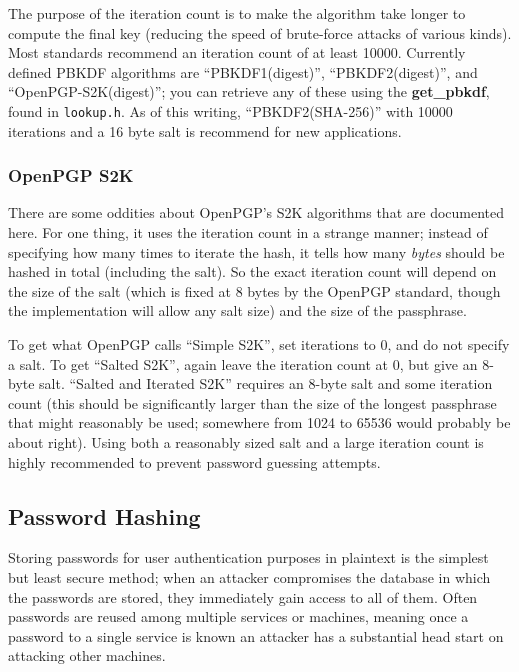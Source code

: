 \documentclass{article}
\newcommand{\filename}[1]{\texttt{#1}}
\newcommand{\function}[1]{\textbf{#1}}
\begin{document}
The purpose of the iteration count is to make the algorithm take
longer to compute the final key (reducing the speed of brute-force
attacks of various kinds). Most standards recommend an iteration count
of at least 10000. Currently defined PBKDF algorithms are
``PBKDF1(digest)'', ``PBKDF2(digest)'', and ``OpenPGP-S2K(digest)'';
you can retrieve any of these using the \function{get\_pbkdf}, found in
\filename{lookup.h}. As of this writing, ``PBKDF2(SHA-256)'' with
10000 iterations and a 16 byte salt is recommend for new applications.

\subsubsection{OpenPGP S2K}

There are some oddities about OpenPGP's S2K algorithms that are
documented here. For one thing, it uses the iteration count in a
strange manner; instead of specifying how many times to iterate the
hash, it tells how many \emph{bytes} should be hashed in total
(including the salt). So the exact iteration count will depend on the
size of the salt (which is fixed at 8 bytes by the OpenPGP standard,
though the implementation will allow any salt size) and the size of
the passphrase.

To get what OpenPGP calls ``Simple S2K'', set iterations to 0, and do
not specify a salt. To get ``Salted S2K'', again leave the iteration
count at 0, but give an 8-byte salt. ``Salted and Iterated S2K''
requires an 8-byte salt and some iteration count (this should be
significantly larger than the size of the longest passphrase that
might reasonably be used; somewhere from 1024 to 65536 would probably
be about right). Using both a reasonably sized salt and a large
iteration count is highly recommended to prevent password guessing
attempts.

\subsection{Password Hashing}

Storing passwords for user authentication purposes in plaintext is the
simplest but least secure method; when an attacker compromises the
database in which the passwords are stored, they immediately gain
access to all of them. Often passwords are reused among multiple
services or machines, meaning once a password to a single service is
known an attacker has a substantial head start on attacking other
machines.
\end{document}
